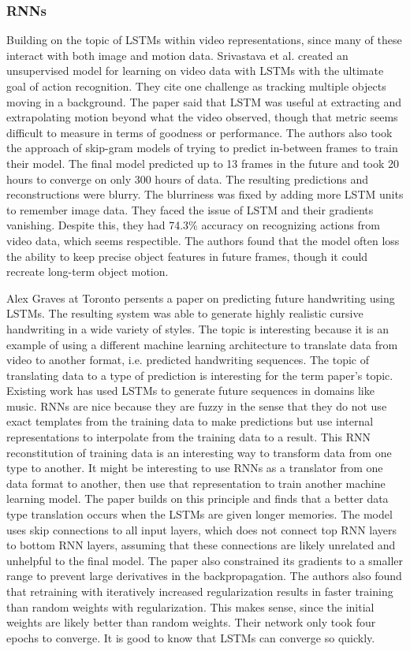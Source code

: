 \subsubsection{RNNs}
Building on the topic of LSTMs within video representations, since many of these interact with both image and motion data.  Srivastava et al. created an unsupervised model for learning on video data with LSTMs with the ultimate goal of action recognition.  They cite one challenge as tracking multiple objects moving in a background.  The paper said that LSTM was useful at extracting and extrapolating motion beyond what the video observed, though that metric seems difficult to measure in terms of goodness or performance. The authors also took the approach of skip-gram models of trying to predict in-between frames to train their model. The final model predicted up to 13 frames in the future and took 20 hours to converge on only 300 hours of data. The resulting predictions and reconstructions were blurry.  The blurriness was fixed by adding more LSTM units to remember image data.  They faced the issue of LSTM and their gradients vanishing.  Despite this, they had 74.3\% accuracy on recognizing actions from video data, which seems respectible.  The authors found that the model often loss the ability to keep precise object features in future frames, though it could recreate long-term object motion. 

Alex Graves at Toronto persents a paper on predicting future handwriting using LSTMs.  The resulting system was able to generate highly realistic cursive handwriting in a wide variety of styles.  The topic is interesting because it is an example of using a different machine learning architecture to translate data from video to another format, i.e. predicted handwriting sequences.  The topic of translating data to a type of prediction is interesting for the term paper's topic.  Existing work has used LSTMs to generate future sequences in domains like music.  RNNs are nice because they are fuzzy in the sense that they do not use exact templates from the training data to make predictions but use internal representations to interpolate from the training data to a result.  This RNN reconstitution of training data is an interesting way to transform data from one type to another.  It might be interesting to use RNNs as a translator from one data format to another, then use that representation to train another machine learning model.  The paper builds on this principle and finds that a better data type translation occurs when the LSTMs are given longer memories.  The model uses skip connections to all input layers, which does not connect top RNN layers to bottom RNN layers, assuming that these connections are likely unrelated and unhelpful to the final model.  The paper also constrained its gradients to a smaller range to prevent large derivatives in the backpropagation.  The authors also found that retraining with iteratively increased regularization results in faster training than random weights with regularization.  This makes sense, since the initial weights are likely better than random weights.  Their network only took four epochs to converge.  It is good to know that LSTMs can converge so quickly.

